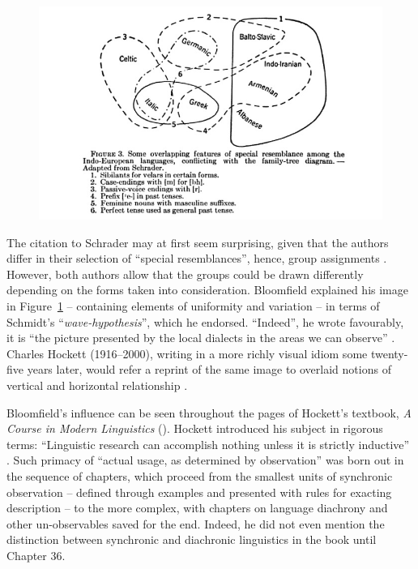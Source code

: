 \documentclass[output=paper]{langscibook}
\begin{document}
\begin{figure}
    \centering
    \includegraphics[scale=1]{figures/bloomfield1933-316.png}
    \caption{\citet[316]{Bloomfield1933}}
    \label{fig:kaplan:bloomfield316}
\end{figure}

The citation to Schrader may at first seem surprising, given that the authors differ in their selection of ``special resemblances'', hence, group assignments \citep[317]{Bloomfield1933}. However, both authors allow that the groups could be drawn differently depending on the forms taken into consideration. Bloomfield explained his image in Figure~\ref{fig:kaplan:bloomfield316} -- containing elements of uniformity and variation -- in terms of Schmidt's ``\emph{wave-hypothesis}'', which he endorsed. ``Indeed'', he wrote favourably, it is ``the picture presented by the local dialects in the areas we can observe'' \citep[317]{Bloomfield1933}. Charles Hockett (1916--2000), writing in a more richly visual idiom some twenty-five years later, would refer a reprint of the same image to overlaid notions of vertical and horizontal relationship \citep[cf.][]{Huebschmann1875}.

Bloomfield's influence can be seen throughout the pages of Hockett's textbook, \emph{A Course in Modern Linguistics} (\citeyear{Hockett19591958}). Hockett introduced his subject in rigorous terms: ``Linguistic research can accomplish nothing unless it is strictly inductive'' \citep[7]{Hockett19591958}. Such primacy of ``actual usage, as determined by observation'' was born out in the sequence of chapters, which proceed from the smallest units of synchronic observation -- defined through examples and presented with rules for exacting description -- to the more complex, with chapters on language diachrony and other un-observables saved for the end. Indeed, he did not even mention the distinction between synchronic and diachronic linguistics in the book until Chapter 36.
\end{document}
